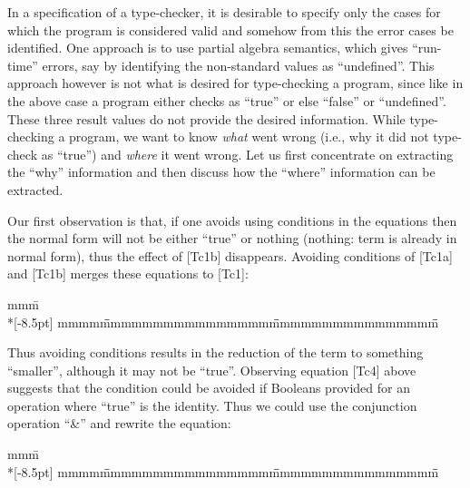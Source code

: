 In a specification of a type-checker, it is desirable to specify 
only the cases for which the program is considered valid and 
somehow from this the error cases be identified.
One approach is to use partial algebra semantics, which
gives ``run-time'' errors, say by identifying the non-standard
values as ``undefined''. This approach however is not what is
desired for type-checking a program, since like in the 
above case a program either checks as ``true'' or else
``false'' or ``undefined''. 
These three result values do not provide the desired information.
While type-checking a program,
we want to know {\em what} went wrong (i.e., why it did
not type-check as ``true'') and {\em where} it went wrong.
Let us first concentrate on extracting the ``why'' information
and then discuss how the ``where'' information can be extracted. 

Our first observation is that, if one avoids using conditions
in the equations then the normal form will not be either ``true'' or 
nothing (nothing: term is already in normal form),
thus the effect of [Tc1b] disappears. 
Avoiding conditions of [Tc1a] and [Tc1b] merges these
equations to [Tc1]:

\begin{tabbing}
mmm\=\kill\pushtabs\\*[-8.5pt]
mmmm\= \=mmmmmmmmmmmmmmmm\= \=mmmmmmmmmmmmmmmm\= \=\kill
{}
\poptabs
\end{tabbing}

Thus avoiding conditions results
in the reduction of the term to something ``smaller'', although it
may not be ``true''. Observing equation [Tc4] above suggests
that the condition could be avoided if Booleans provided for
an operation where ``true'' is the identity.
Thus we could use the conjunction operation ``\&'' and rewrite
the equation:

\begin{tabbing}
mmm\=\kill\pushtabs\\*[-8.5pt]
mmmm\= \=mmmmmmmmmmmmmmmm\= \=mmmmmmmmmmmmmmmm\= \=\kill
{}
\poptabs
\end{tabbing}

